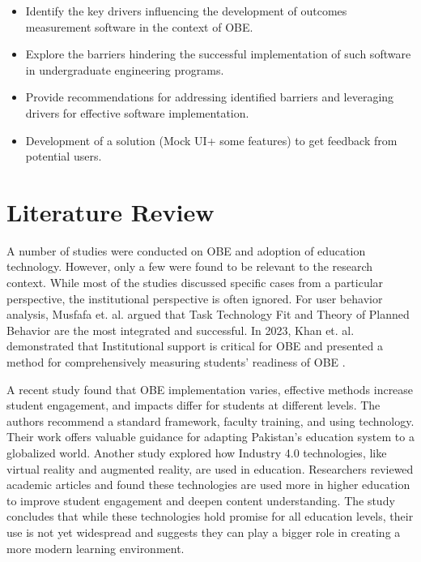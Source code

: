 \documentclass[journal,onecolumn]{IEEEtran}
\begin{document}
\begin{itemize}
    \item Identify the key drivers influencing the development of outcomes measurement software in the context of OBE.
    \item Explore the barriers hindering the successful implementation of such software in undergraduate engineering programs.
    \item Provide recommendations for addressing identified barriers and leveraging drivers for effective software implementation.
    \item Development of a solution (Mock UI+ some features) to get feedback from potential users.
\end{itemize}


\section{\textbf{Literature Review}}
A number of studies were conducted on OBE and adoption of education technology. However, only a few were found to be relevant to the research context. While most of the studies discussed specific cases from a particular perspective, the institutional perspective is often ignored. For user behavior analysis, Musfafa et. al. argued \cite{mustafa_theories_2021} that Task Technology Fit and Theory of Planned Behavior are the most integrated and successful. In 2023, Khan et. al. demonstrated that Institutional support is critical for OBE and presented a method for comprehensively measuring students’ readiness of OBE \cite{khan_factors_2023}. 
\vspace{6pt}


A recent study \cite{sain_transformative_2024} found that OBE implementation varies, effective methods increase student engagement, and impacts differ for students at different levels. The authors recommend a standard framework, faculty training, and using technology. Their work offers valuable guidance for adapting Pakistan's education system to a globalized world. Another study \cite{moraes_integration_2022} explored how Industry 4.0 technologies, like virtual reality and augmented reality, are used in education.  Researchers reviewed academic articles and found these technologies are used more in higher education to improve student engagement and deepen content understanding.  The study concludes that while these technologies hold promise for all education levels, their use is not yet widespread and suggests they can play a bigger role in creating a more modern learning environment.
\vspace{6pt}
\end{document}
